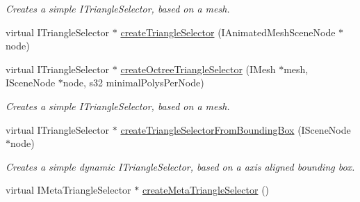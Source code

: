 \begin{DoxyCompactItemize}
\begin{DoxyCompactList}\small\item\em Creates a simple I\-Triangle\-Selector, based on a mesh. \end{DoxyCompactList}\item 
virtual I\-Triangle\-Selector $\ast$ \hyperlink{classirr_1_1scene_1_1_c_scene_manager_a90637f2287c1e4d6167b6d638a17d5ca}{create\-Triangle\-Selector} (I\-Animated\-Mesh\-Scene\-Node $\ast$node)
\item 
\hypertarget{classirr_1_1scene_1_1_c_scene_manager_a1c9ff1d31e29c3762077845b9575eafb}{virtual I\-Triangle\-Selector $\ast$ \hyperlink{classirr_1_1scene_1_1_c_scene_manager_a1c9ff1d31e29c3762077845b9575eafb}{create\-Octree\-Triangle\-Selector} (I\-Mesh $\ast$mesh, I\-Scene\-Node $\ast$node, s32 minimal\-Polys\-Per\-Node)}\label{classirr_1_1scene_1_1_c_scene_manager_a1c9ff1d31e29c3762077845b9575eafb}

\begin{DoxyCompactList}\small\item\em Creates a simple I\-Triangle\-Selector, based on a mesh. \end{DoxyCompactList}\item 
\hypertarget{classirr_1_1scene_1_1_c_scene_manager_a05e4fdafec6a433c58e3a2a1319fec41}{virtual I\-Triangle\-Selector $\ast$ \hyperlink{classirr_1_1scene_1_1_c_scene_manager_a05e4fdafec6a433c58e3a2a1319fec41}{create\-Triangle\-Selector\-From\-Bounding\-Box} (I\-Scene\-Node $\ast$node)}\label{classirr_1_1scene_1_1_c_scene_manager_a05e4fdafec6a433c58e3a2a1319fec41}

\begin{DoxyCompactList}\small\item\em Creates a simple dynamic I\-Triangle\-Selector, based on a axis aligned bounding box. \end{DoxyCompactList}\item 
\hypertarget{classirr_1_1scene_1_1_c_scene_manager_ab7e05cbd557f77fdca8167f00cb5453f}{virtual I\-Meta\-Triangle\-Selector $\ast$ \hyperlink{classirr_1_1scene_1_1_c_scene_manager_ab7e05cbd557f77fdca8167f00cb5453f}{create\-Meta\-Triangle\-Selector} ()}\label{classirr_1_1scene_1_1_c_scene_manager_ab7e05cbd557f77fdca8167f00cb5453f}


\end{DoxyCompactItemize}
